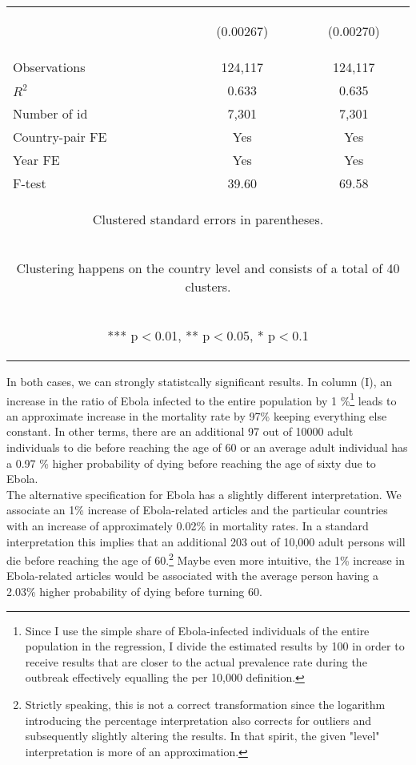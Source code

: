 \documentclass{article}
\begin{document}
\begin{center}
\begin{table}[htbp]
\begin{tabular}{lcc}
\vspace{4pt} & \begin{footnotesize}(0.00267)\end{footnotesize} & \begin{footnotesize}(0.00270)\end{footnotesize} \\
Observations & 124,117 & 124,117 \\
$R^2$ & 0.633 & 0.635 \\
Number of id & 7,301 & 7,301 \\
Country-pair FE & Yes & Yes \\
Year FE & Yes & Yes \\
F-test & 39.60 & 69.58 \\ \hline
\multicolumn{3}{c}{\begin{footnotesize} Clustered standard errors in parentheses. \end{footnotesize} }\\
\multicolumn{3}{c}{\begin{footnotesize} Clustering happens on the country level and consists of a total of 40 clusters. \end{footnotesize}} \\
\multicolumn{3}{c}{\begin{footnotesize} *** p$<$0.01, ** p$<$0.05, * p$<$0.1\end{footnotesize}} \\
\end{tabular}
\end{table}
\end{center}
In both cases, we can strongly statistcally significant results. In column (I), an increase in the ratio of Ebola infected to the entire population by 1 \%\footnote{Since I use the simple share of Ebola-infected individuals of the entire population in the regression, I divide the estimated results by 100 in order to receive results that are closer to the actual prevalence rate during the outbreak effectively equalling the per 10,000 definition.} leads to an approximate increase in the mortality rate by 97\% keeping everything else constant. In other terms, there are an additional 97 out of 10000 adult individuals to die before reaching the age of 60 or an average adult individual has a 0.97 \% higher probability of dying before reaching the age of sixty due to Ebola. \\
The alternative specification for Ebola has a slightly different interpretation. We associate an 1\% increase of Ebola-related articles and the particular countries with an increase of approximately 0.02\% in mortality rates. In a standard interpretation this implies that an additional 203 out of 10,000 adult persons will die before reaching the age of 60.\footnote{Strictly speaking, this is not a correct transformation since the logarithm introducing the percentage interpretation also corrects for outliers and subsequently slightly altering the results. In that spirit, the given "level" interpretation is more of an approximation.} Maybe even more intuitive, the 1\% increase in Ebola-related articles would be associated with the average person having a 2.03\% higher probability of dying before turning 60. \\
\end{document}

